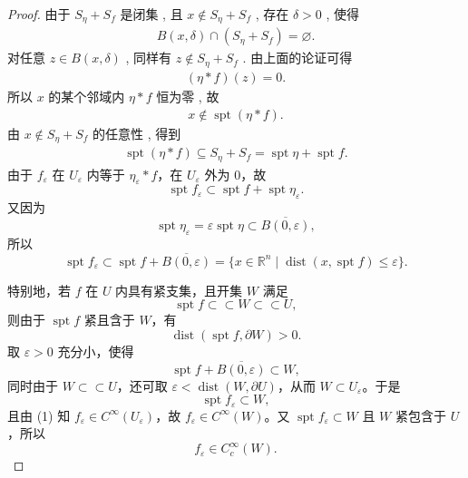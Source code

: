 \documentclass[../main.tex]{subfiles}
\begin{document}
\begin{proof}
由于 $S_\eta+S_f$ 是闭集 , 且 $x\notin S_\eta+S_f$ , 存在 $\delta>0$ , 使得
\begin{align*}
B(x,\delta)\cap (S_\eta+S_f)=\varnothing.
\end{align*}
对任意 $z\in B(x,\delta)$ , 同样有 $z\notin S_\eta+S_f$ . 由上面的论证可得
\begin{align*}
(\eta*f)(z)=0.
\end{align*}
所以 $x$ 的某个邻域内 $\eta*f$ 恒为零 , 故
\begin{align*}
x\notin \operatorname{spt}(\eta*f).
\end{align*}
由 $x\notin S_\eta+S_f$ 的任意性 , 得到
\begin{align*}
\operatorname{spt}(\eta*f)\subseteq S_\eta+S_f=\operatorname{spt}\eta+\operatorname{spt}f.
\end{align*}
由于 \(f_\varepsilon\) 在 \(U_\varepsilon\) 内等于 \(\eta_\varepsilon*f\)，在 \(U_\varepsilon\) 外为 \(0\)，故
\[
\operatorname{spt}f_\varepsilon
\subset \operatorname{spt}f+\operatorname{spt}\eta_\varepsilon.
\]
又因为
\[
\operatorname{spt}\eta_\varepsilon
=\varepsilon\operatorname{spt}\eta
\subset \overline{B(0,\varepsilon)},
\]
所以
\[
\operatorname{spt}f_\varepsilon
\subset \operatorname{spt}f+\overline{B(0,\varepsilon)}
=\{x\in\mathbb R^n\mid \operatorname{dist}(x,\operatorname{spt}f)\le\varepsilon\}.
\]

特别地，若 \(f\) 在 \(U\) 内具有紧支集，且开集 \(W\) 满足
\[
\operatorname{spt}f\subset\subset W\subset\subset U,
\]
则由于 \(\operatorname{spt}f\) 紧且含于 \(W\)，有
\[
\operatorname{dist}(\operatorname{spt}f,\partial W)>0.
\]
取 \(\varepsilon>0\) 充分小，使得
\[
\operatorname{spt}f+\overline{B(0,\varepsilon)}\subset W,
\]
同时由于 \(W\subset\subset U\)，还可取 \(\varepsilon<\operatorname{dist}(W,\partial U)\)，从而 \(W\subset U_\varepsilon\)。于是
\[
\operatorname{spt}f_\varepsilon\subset W,
\]
且由 (1) 知 \(f_\varepsilon\in C^\infty(U_\varepsilon)\)，故 \(f_\varepsilon\in C^\infty(W)\)。又 \(\operatorname{spt}f_\varepsilon\subset W\) 且 \(W\) 紧包含于 \(U\)，所以
\[
f_\varepsilon\in C_c^\infty(W).
\]


\end{proof}
\end{document}
